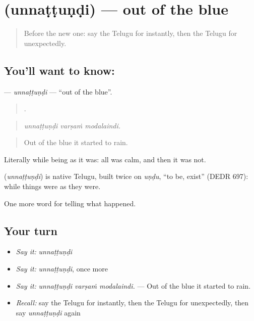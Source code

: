 \section[\texorpdfstring{\te{ఉన్నట్టుండి} (unnaṭṭuṇḍi)}{ఉన్నట్టుండి (unnaṭṭuṇḍi)}]{ (unnaṭṭuṇḍi) — out of the blue}

\label{lesson:TE-C340-unnattundi}



\begin{quote}
Before the new one: say the Telugu for instantly, then the Telugu for unexpectedly.
\end{quote}

\subsection*{You'll want to know: }
\textbf{} — \emph{unnaṭṭuṇḍi} — \textquotedblleft{}out of the blue\textquotedblright{}.

\begin{quote}
  .
\end{quote}

\begin{quote}
\emph{unnaṭṭuṇḍi varṣaṁ modalaindi.}
\end{quote}

\begin{quote}
Out of the blue it started to rain.
\end{quote}

Literally while being as it was: all was calm, and then it was not.

\begin{cousinweb}
\textbf{} (\emph{unnaṭṭuṇḍi}) is native Telugu, built twice on \emph{uṇḍu}, \textquotedblleft{}to be, exist\textquotedblright{} (DEDR 697): while things were as they were.
\end{cousinweb}

\begin{grammarlens}[title={What you've built}]
One more word for telling what happened.
\end{grammarlens}

\subsection*{Your turn}
\begin{itemize}
\raggedright
  \item \emph{Say it:} \emph{unnaṭṭuṇḍi}
  \item \emph{Say it:} \emph{unnaṭṭuṇḍi}, once more
  \item \emph{Say it:} \emph{unnaṭṭuṇḍi varṣaṁ modalaindi.} — Out of the blue it started to rain.
  \item \emph{Recall:} say the Telugu for instantly, then the Telugu for unexpectedly, then say \emph{unnaṭṭuṇḍi} again
\end{itemize}

